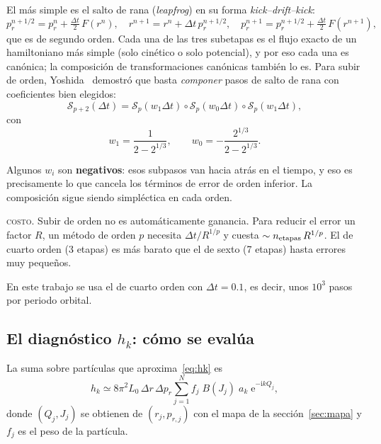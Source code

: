 \documentclass[11pt,a4paper]{article}
\newcommand{\ee}{\mathrm{e}}
\newcommand{\ii}{\mathrm{i}}
\newcommand{\rp}{p_r}
\newcommand{\Jr}{J}
\newcommand{\Qr}{Q}
\theoremstyle{definition}
\begin{document}
El más simple es el salto de rana (\emph{leapfrog}) en su forma
\emph{kick--drift--kick}:
\begin{equation}
  \rp^{n+1/2} = \rp^{n} + \tfrac{\Delta t}{2}\,F(r^n),\quad
  r^{n+1}    = r^{n} + \Delta t\,\rp^{n+1/2},\quad
  \rp^{n+1}  = \rp^{n+1/2} + \tfrac{\Delta t}{2}\,F(r^{n+1}),
  \label{eq:leapfrog}
\end{equation}
que es de segundo orden. Cada una de las tres subetapas es el flujo exacto de un
hamiltoniano más simple (solo cinético o solo potencial), y por eso cada una es
canónica; la composición de transformaciones canónicas también lo es. Para subir de
orden, Yoshida~\cite{yoshida1990} demostró que basta \emph{componer} pasos de salto
de rana con coeficientes bien elegidos:
\begin{equation}
  \mathcal{S}_{p+2}(\Delta t) = \mathcal{S}_p(w_1\Delta t)\circ
                                \mathcal{S}_p(w_0\Delta t)\circ
                                \mathcal{S}_p(w_1\Delta t),
\end{equation}
con
\begin{equation}
  w_1 = \frac{1}{2-2^{1/3}},\qquad w_0 = -\frac{2^{1/3}}{2-2^{1/3}} .
  \label{eq:yoshida}
\end{equation}

\begin{aviso}
Algunos $w_i$ son \textbf{negativos}: esos subpasos van hacia atrás en el tiempo, y
eso es precisamente lo que cancela los términos de error de orden inferior. La
composición sigue siendo simpléctica en cada orden.

\medskip
\textsc{costo.} Subir de orden no es automáticamente ganancia. Para reducir el
error un factor $R$, un método de orden $p$ necesita $\Delta t/R^{1/p}$ y cuesta
$\sim n_{\rm etapas}\,R^{1/p}$. El de cuarto orden (3 etapas) es más barato que el
de sexto (7 etapas) hasta errores muy pequeños.
\end{aviso}

En este trabajo se usa el de cuarto orden con $\Delta t = 0.1$, es decir, unos
$10^3$ pasos por periodo orbital.

\subsection{\texorpdfstring{El diagnóstico $h_k$: cómo se evalúa}{El diagnóstico hk: cómo se evalúa}}

La suma sobre partículas que aproxima~\eqref{eq:hk} es
\begin{equation}
  h_k \simeq 8\pi^2 L_0 \,\Delta r\,\Delta \rp
       \sum_{j=1}^{N} f_j\; B(\Jr_j)\;a_k\;\ee^{-\ii k \Qr_j},
  \label{eq:hksuma}
\end{equation}
donde $(\Qr_j,\Jr_j)$ se obtienen de $(r_j,p_{r,j})$ con el mapa de la
sección~\ref{sec:mapa} y $f_j$ es el peso de la partícula.
\end{document}
